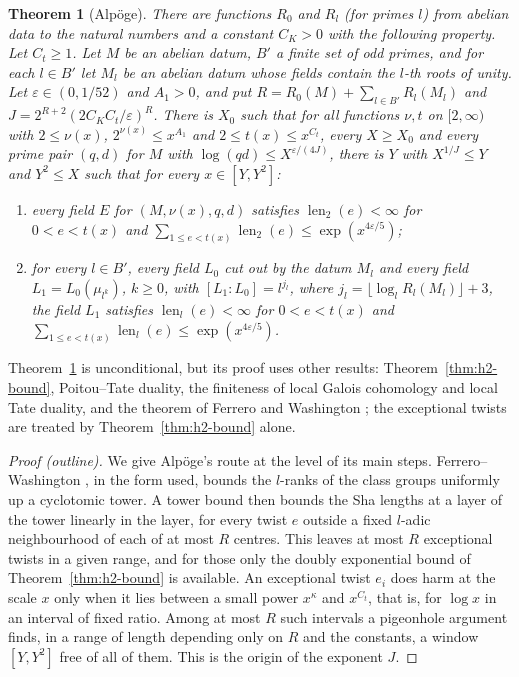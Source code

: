 \documentclass[11pt]{amsbook}
\theoremstyle{plain}
\newtheorem{theorem}{Theorem}[section]
\theoremstyle{definition}
\theoremstyle{remark}
\numberwithin{equation}{section}
\numberwithin{figure}{chapter}
\numberwithin{table}{chapter}
\newcommand{\eps}{\varepsilon}
\newcommand{\shalen}{\operatorname{len}}
\begin{document}
\begin{theorem}[Alp\"oge]\label{thm:windows-pigeonhole}
There are functions $R_0$ and $R_l$ (for primes $l$) from abelian data
to the natural numbers and a constant $C_K>0$ with the following
property. Let $C_t\ge1$. Let $M$ be an abelian datum, $B'$ a finite set
of odd primes, and for each $l\in B'$ let $M_l$ be an abelian datum
whose fields contain the $l$-th roots of unity. Let $\eps\in(0,1/52)$
and $A_1>0$, and put $R=R_0(M)+\sum_{l\in B'}R_l(M_l)$ and
$J=2^{R+2}(2C_KC_t/\eps)^R$. There is $X_0$ such that for all functions
$\nu,t$ on $[2,\infty)$ with
$2\le\nu(x)$, $2^{\nu(x)}\le x^{A_1}$ and $2\le t(x)\le x^{C_t}$, every
$X\ge X_0$ and every prime pair $(q,d)$ for $M$ with
$\log(qd)\le X^{\eps/(4J)}$, there is $Y$ with $X^{1/J}\le Y$ and
$Y^2\le X$ such that for every $x\in[Y,Y^2]$:
\begin{enumerate}[label=(\alph*)]
\item\label{item:pig-two} every field $E$ for $(M,\nu(x),q,d)$
satisfies $\shalen_2(e)<\infty$ for $0<e<t(x)$ and
$\sum_{1\le e<t(x)}\shalen_2(e)\le\exp(x^{4\eps/5})$;
\item\label{item:pig-bad} for every $l\in B'$, every field $L_0$ cut out by
the datum $M_l$ and every field $L_1=L_0(\mu_{l^k})$, $k\ge0$, with
$[L_1:L_0]=l^{j_l}$, where
$j_l=\lfloor\log_lR_l(M_l)\rfloor+3$, the field $L_1$ satisfies
$\shalen_l(e)<\infty$ for $0<e<t(x)$ and
$\sum_{1\le e<t(x)}\shalen_l(e)\le\exp(x^{4\eps/5})$.
\end{enumerate}
\end{theorem}

\noindent Theorem~\ref{thm:windows-pigeonhole} is unconditional, but its
proof uses other results: Theorem~\ref{thm:h2-bound}, Poitou--Tate
duality, the finiteness of local Galois cohomology and local Tate
duality, and the theorem
of Ferrero and Washington \cite{FerreroWashington1979}; the exceptional
twists are treated by Theorem~\ref{thm:h2-bound} alone.

\begin{proof}[Proof (outline)]
We give Alp\"oge's route at the level of its main steps.
Ferrero--Washington
\cite{FerreroWashington1979}, in the form used, bounds the $l$-ranks
of the class groups uniformly up a cyclotomic tower. A tower bound then
bounds the Sha lengths at a layer of the tower linearly in the layer,
for every twist $e$ outside a fixed $l$-adic neighbourhood of each of
at most $R$ centres. This leaves at most $R$ exceptional twists in a
given range, and for those only the doubly exponential bound of
Theorem~\ref{thm:h2-bound} is available. An
exceptional twist $e_i$ does harm at the scale $x$ only when it lies
between a small power $x^{\kappa}$ and $x^{C_t}$, that is, for $\log x$
in an interval of fixed ratio. Among at most $R$ such intervals a
pigeonhole argument finds, in a range of length depending only on $R$
and the constants, a window $[Y,Y^2]$ free of all of them. This is the
origin of the exponent $J$.
\end{proof}
\end{document}
